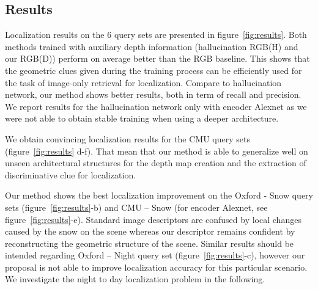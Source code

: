 

\subsection{Results}
\label{subsec:results}

Localization results on the 6 query sets are presented in figure~\ref{fig:results}. Both methods trained with auxiliary depth information (hallucination RGB(H) and our RGB(D)) perform on average better than the RGB baseline. This shows that the geometric clues given during the training process can be efficiently used for the task of image-only retrieval for localization. Compare to hallucination network, our method shows better results, both in term of recall and precision. We report results for the hallucination network only with encoder Alexnet as we were not able to obtain stable training when using a deeper architecture.

We obtain convincing localization results for the CMU query sets (figure~\ref{fig:results} d-f). That mean that our method is able to generalize well on unseen architectural structures for the depth map creation and the extraction of discriminative clue for localization.

Our method shows the best localization improvement on the Oxford - Snow query sets (figure~\ref{fig:results}-b) and CMU -- Snow (for encoder Alexnet, see figure~\ref{fig:results}-e). Standard image descriptors are confused by local changes caused by the snow on the scene whereas our descriptor remains confident by reconstructing the geometric structure of the scene. Similar results should be intended regarding Oxford -- Night query set (figure~\ref{fig:results}-c), however our proposal is not able to improve localization accuracy for this particular scenario. We investigate the night to day localization problem in the following.